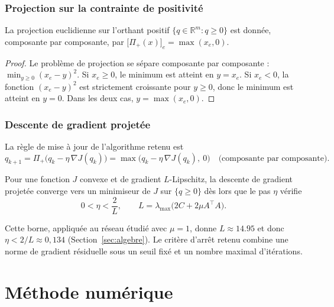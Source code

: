 \documentclass[11pt]{ama-article}
\begin{document}
\subsubsection{Projection sur la contrainte de positivité}

\begin{proposition}
La projection euclidienne sur l'orthant positif $\{q\in\mathbb{R}^m : q\ge 0\}$ est donnée,
composante par composante, par $\big[\Pi_{+}(x)\big]_e = \max(x_e,0)$.
\end{proposition}

\begin{proof}
Le problème de projection se sépare composante par composante :
$\min_{y\ge 0} (x_e-y)^2$. Si $x_e\ge 0$, le minimum est atteint en $y=x_e$. Si $x_e<0$, la
fonction $(x_e-y)^2$ est strictement croissante pour $y\ge 0$, donc le minimum est atteint en
$y=0$. Dans les deux cas, $y=\max(x_e,0)$.
\end{proof}

\subsubsection{Descente de gradient projetée}

La règle de mise à jour de l'algorithme retenu est
\begin{equation}
q_{k+1} = \Pi_{+}\big(q_k - \eta\,\nabla J(q_k)\big) = \max\big(q_k-\eta\,\nabla J(q_k),\ 0\big)
\quad \text{(composante par composante).}
\label{eq:mise-a-jour}
\end{equation}

\begin{proposition}
Pour une fonction $J$ convexe et de gradient $L$-Lipschitz, la descente de gradient projetée
converge vers un minimiseur de $J$ sur $\{q\ge 0\}$ dès lors que le pas $\eta$ vérifie
\begin{equation}
0 < \eta < \frac{2}{L}, \qquad L = \lambda_{\max}\big(2C+2\mu A^\top A\big).
\end{equation}
\end{proposition}

Cette borne, appliquée au réseau étudié avec $\mu=1$, donne $L\approx 14.95$ et donc
$\eta<2/L\approx 0{,}134$ (Section~\ref{sec:algebre}). Le critère d'arrêt retenu combine une
norme de gradient résiduelle sous un seuil fixé et un nombre maximal d'itérations.

\section{Méthode numérique}
\label{sec:methode-numerique}
\end{document}
